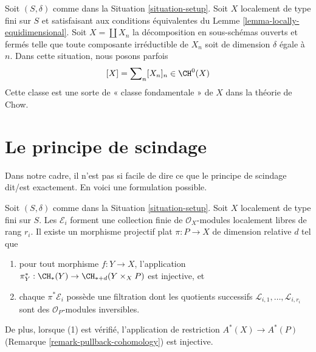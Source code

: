 \begin{remark}
\label{remark-fundamental-class}
Soit $(S, \delta)$ comme dans la Situation \ref{situation-setup}.
Soit $X$ localement de type fini sur $S$ et satisfaisant aux
conditions équivalentes du Lemme \ref{lemma-locally-equidimensional}.
Soit $X = \coprod X_n$ la décomposition en sous-schémas ouverts et fermés
telle que toute composante irréductible de $X_n$ soit de
dimension $\delta$ égale à $n$. Dans cette situation, nous posons parfois
$$
[X] = \sum\nolimits_n [X_n]_n \in \CH^0(X)
$$
Cette classe est une sorte de « classe fondamentale » de $X$ dans la théorie de Chow.
\end{remark}




\section{Le principe de scindage}
\label{section-splitting-principle}

\noindent
Dans notre cadre, il n'est pas si facile de dire ce que le principe de scindage
dit/est exactement. En voici une formulation possible.

\begin{lemma}
\label{lemma-splitting-principle}
Soit $(S, \delta)$ comme dans la Situation \ref{situation-setup}. Soit $X$ localement
de type fini sur $S$. Les $\mathcal{E}_i$ forment une collection finie de
$\mathcal{O}_X$-modules localement libres de rang $r_i$. Il existe un morphisme
projectif plat $\pi : P \to X$ de dimension relative $d$ tel que
\begin{enumerate}
\item pour tout morphisme $f : Y \to X$, l'application
$\pi_Y^* : \CH_*(Y) \to \CH_{* + d}(Y \times_X P)$ est injective, et
\item chaque $\pi^*\mathcal{E}_i$ possède une filtration
dont les quotients successifs $\mathcal{L}_{i, 1}, \ldots, \mathcal{L}_{i, r_i}$
sont des ${\mathcal O}_P$-modules inversibles.
\end{enumerate}
De plus, lorsque (1) est vérifié, l'application de restriction $A^*(X) \to A^*(P)$
(Remarque \ref{remark-pullback-cohomology}) est injective.
\end{lemma}

